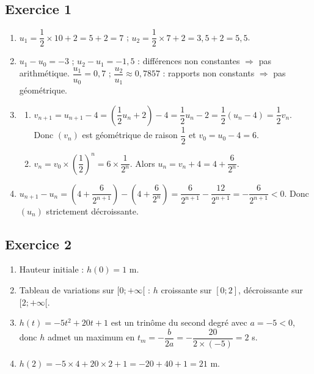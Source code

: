 \documentclass[a4paper, 12pt]{article}
\begin{document}
\subsection*{Exercice 1}
\begin{enumerate}
    \item $u_1 = \dfrac12\times 10 + 2 = 5+2=7$ ; $u_2 = \dfrac12\times 7 + 2 = 3,5+2 = 5,5$.
    \item $u_1-u_0 = -3$ ; $u_2-u_1 = -1,5$ : différences non constantes $\Rightarrow$ pas arithmétique. $\dfrac{u_1}{u_0}=0,7$ ; $\dfrac{u_2}{u_1}\approx 0,7857$ : rapports non constants $\Rightarrow$ pas géométrique.
    \item \begin{enumerate}
        \item $v_{n+1} = u_{n+1}-4 = \left(\dfrac12 u_n+2\right)-4 = \dfrac12 u_n -2 = \dfrac12 (u_n-4) = \dfrac12 v_n$. Donc $(v_n)$ est géométrique de raison $\dfrac12$ et $v_0 = u_0-4 = 6$.
        \item $v_n = v_0 \times \left(\dfrac12\right)^n = 6\times \dfrac{1}{2^n}$. Alors $u_n = v_n+4 = 4 + \dfrac{6}{2^n}$.
    \end{enumerate}
    \item $u_{n+1}-u_n = \left(4+\dfrac{6}{2^{n+1}}\right) - \left(4+\dfrac{6}{2^n}\right) = \dfrac{6}{2^{n+1}} - \dfrac{12}{2^{n+1}} = -\dfrac{6}{2^{n+1}} <0$. Donc $(u_n)$ strictement décroissante.
   
\end{enumerate}

\subsection*{Exercice 2}
\begin{enumerate}
    \item Hauteur initiale : $h(0) = 1$ m.
 \item Tableau de variations sur $[0;+\infty[$ : $h$ croissante sur $[0;2]$, décroissante sur $[2;+\infty[$.
    \item $h(t) = -5t^2+20t+1$ est un trinôme du second degré avec $a=-5<0$, donc $h$ admet un maximum en $t_m = -\dfrac{b}{2a} = -\dfrac{20}{2\times(-5)} = 2$ s.
    \item $h(2) = -5\times 4 + 20\times 2 + 1 = -20+40+1 = 21$ m.
    
 
\end{enumerate}
\end{document}
